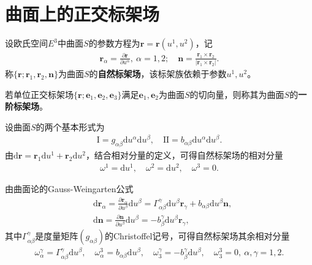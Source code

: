 \documentclass[../../main.tex]{subfiles}%
\begin{document}
\section{曲面上的正交标架场}

\begin{definition}
设欧氏空间$E^3$中曲面$S$的参数方程为$\boldsymbol{r}=\boldsymbol{r}(u^1,u^2)$，记
\begin{align}
\boldsymbol{r}_\alpha=\frac{\partial \boldsymbol{r}}{\partial u^\alpha},\ \alpha=1,2;\quad \boldsymbol{n}=\frac{\boldsymbol{r}_1\times\boldsymbol{r}_2}{|\boldsymbol{r}_1\times\boldsymbol{r}_2|}.
\label{eq:natural-frame-def}
\end{align}
称$\{\boldsymbol{r};\boldsymbol{r}_1,\boldsymbol{r}_2,\boldsymbol{n}\}$为曲面$S$的\textbf{自然标架场}，该标架族依赖于参数$u^1,u^2$。

若单位正交标架场$\{\boldsymbol{r};\boldsymbol{e}_1,\boldsymbol{e}_2,\boldsymbol{e}_3\}$满足$\boldsymbol{e}_1,\boldsymbol{e}_2$为曲面$S$的切向量，则称其为曲面$S$的\textbf{一阶标架场}。
\end{definition}

设曲面$S$的两个基本形式为
\begin{align}
\mathrm{I}=g_{\alpha\beta}\mathrm{d}u^\alpha\mathrm{d}u^\beta,\quad \mathrm{II}=b_{\alpha\beta}\mathrm{d}u^\alpha\mathrm{d}u^\beta.
\label{eq:two-fundamental-forms}
\end{align}
由$\mathrm{d}\boldsymbol{r}=\boldsymbol{r}_1\mathrm{d}u^1+\boldsymbol{r}_2\mathrm{d}u^2$，结合相对分量的定义，可得自然标架场的相对分量
\begin{align}
\omega^1=\mathrm{d}u^1,\quad \omega^2=\mathrm{d}u^2,\quad \omega^3=0.
\label{eq:natural-omega123}
\end{align}

由曲面论的Gauss-Weingarten公式
\begin{align*}
&\mathrm{d}\boldsymbol{r}_\alpha=\frac{\partial \boldsymbol{r}_\alpha}{\partial u^\beta}\mathrm{d}u^\beta=\Gamma^\gamma_{\alpha\beta}\mathrm{d}u^\beta\boldsymbol{r}_\gamma+b_{\alpha\beta}\mathrm{d}u^\beta\boldsymbol{n},\\
&\mathrm{d}\boldsymbol{n}=\frac{\partial \boldsymbol{n}}{\partial u^\beta}\mathrm{d}u^\beta=-b^\gamma_\beta\mathrm{d}u^\beta\boldsymbol{r}_\gamma,
\end{align*}
其中$\Gamma^\gamma_{\alpha\beta}$是度量矩阵$(g_{\alpha\beta})$的Christoffel记号，可得自然标架场其余相对分量
\begin{align}
\omega^\gamma_\alpha=\Gamma^\gamma_{\alpha\beta}\mathrm{d}u^\beta,\quad \omega^3_\alpha=b_{\alpha\beta}\mathrm{d}u^\beta,\quad \omega^\gamma_3=-b^\gamma_\beta\mathrm{d}u^\beta,\quad \omega^3_3=0,\ \alpha,\gamma=1,2.
\label{eq:natural-omega-i-j}
\end{align}
\end{document}
